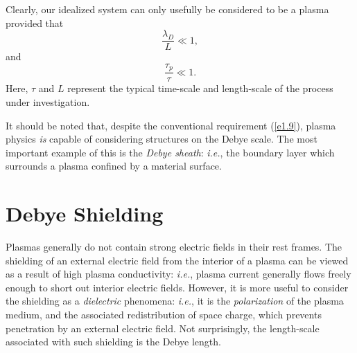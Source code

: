 Clearly, our idealized system can  only usefully be considered to be a plasma provided 
that
\begin{equation}\label{e1.9}
\frac{\lambda_D}{L} \ll 1,
\end{equation}
and
\begin{equation}
\frac{\tau_p}{\tau}\ll 1.
\end{equation}
Here, $\tau$ and $L$ represent the typical time-scale and length-scale of the
process under investigation.

It should be noted that, despite the conventional requirement (\ref{e1.9}),
plasma physics {\em is}\/  capable of considering structures on the Debye scale.
The most important example of this is the {\em Debye sheath}: {\em i.e.}, the
boundary layer which surrounds
a plasma confined  by a material surface. 

\section{Debye Shielding}
Plasmas generally do not contain strong electric fields in their
rest frames. The shielding of an external electric field from the
interior of a plasma can be viewed as a result of  high plasma conductivity:
{\em i.e.}, plasma current generally flows freely enough to short out interior electric fields.
However, it is more useful to consider the shielding as a {\em dielectric}\/ 
phenomena: {\em i.e.}, it is the {\em polarization}\/ of the plasma medium, and the
associated redistribution of space charge, which prevents penetration by an
external electric field. Not surprisingly, the length-scale associated with such
shielding is the Debye length.

